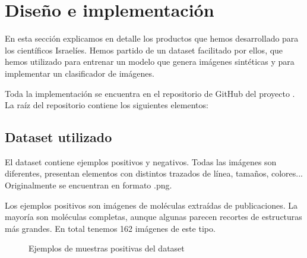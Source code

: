 \chapter{Diseño e implementación}

En esta sección explicamos en detalle los productos que hemos desarrollado para los científicos Israelíes. Hemos partido de un dataset facilitado por ellos, que hemos utilizado para entrenar un modelo que genera imágenes sintéticas y para implementar un clasificador de imágenes.

Toda la implementación se encuentra en el repositorio de GitHub del proyecto \cite{repository}. La raíz del repositorio contiene los siguientes elementos:


\section{Dataset utilizado}
El dataset contiene ejemplos positivos y negativos. Todas las imágenes son diferentes, presentan elementos con distintos trazados de línea, tamaños, colores... Originalmente se encuentran en formato .png.

Los ejemplos positivos son imágenes de moléculas extraídas de publicaciones. La mayoría son moléculas completas, aunque algunas parecen recortes de estructuras más grandes. En total tenemos 162 imágenes de este tipo.

\begin{figure}[H]
\centering
    \caption{Ejemplos de muestras positivas del dataset} 
\end{figure}

